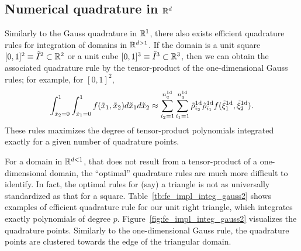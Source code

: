 \subsection{Numerical quadrature in $\mathbb{R}^d$}
\label{sec:fe_quad_nd}
Similarly to the Gauss quadrature in $\mathbb{R}^1$, there also exists efficient quadrature rules for integration of domains in $\mathbb{R}^{d > 1}$.  If the domain is a unit square $[0,1]^2 \equiv \tilde I^2 \subset \mathbb{R}^2$ or a unit cube $[0,1]^3 \equiv \tilde I^3 \subset \mathbb{R}^3$, then we can obtain the associated quadrature rule by the tensor-product of the one-dimensional Gauss rules; for example, for $[0,1]^2$, 
\begin{equation*}
  \int_{\tilde x_2=0}^1 \int_{\tilde x_1=0}^1 f(\tilde x_1,\tilde x_2) d\tilde x_1 d\tilde x_2
  \approx \sum_{i_2 = 1}^{n_q^{\rm 1d}} \sum_{i_1 = 1}^{n_q^{\rm 1d}} \tilde \rho_{i_2}^{\rm 1d} \tilde \rho_{i_1}^{\rm 1d} f(\tilde \xi_1^{\rm 1d}, \tilde \xi_2^{\rm 1d}).
\end{equation*}
These rules maximizes the degree of tensor-product polynomials integrated exactly for a given number of quadrature points.

For a domain in $\mathbb{R}^{d < 1}$, that does not result from a tensor-product of a one-dimensional domain, the ``optimal'' quadrature rules are much more difficult to identify.  In fact, the optimal rules for (say) a triangle is not as universally standardized as that for a square. Table~\ref{tb:fe_impl_integ_gauss2} shows examples of efficient quadrature rule for our unit right triangle, which integrates exactly polynomials of degree $p$.  Figure~\ref{fig:fe_impl_integ_gauss2} visualizes the quadrature points.  Similarly to the one-dimensional Gauss rule, the quadrature points are clustered towards the edge of the triangular domain.


